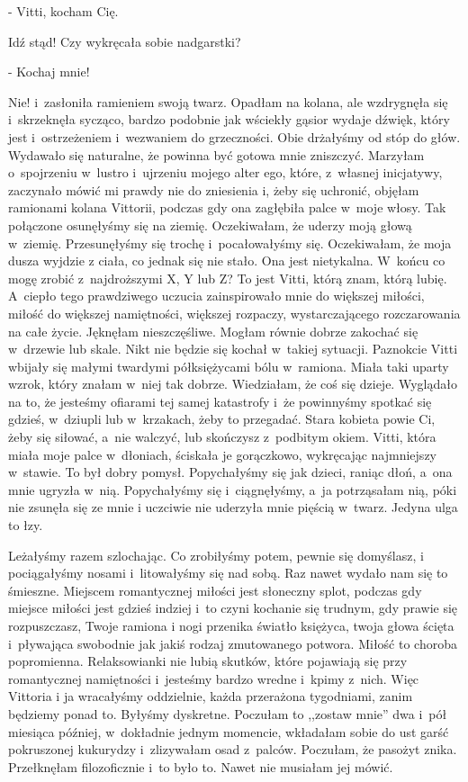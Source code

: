 \documentclass[oneside,polish,12pt,sfheadings]{mwbk}
\begin{document}
- Vitti, kocham Cię.

Idź stąd! Czy wykręcała sobie nadgarstki?

- Kochaj mnie!

Nie! i~zasłoniła ramieniem swoją twarz. Opadłam na kolana, ale wzdrygnęła
się i~skrzeknęła sycząco, bardzo podobnie jak wściekły gąsior wydaje
dźwięk, który jest i~ostrzeżeniem i~wezwaniem do grzeczności. Obie
drżałyśmy od stóp do głów. Wydawało się naturalne, że powinna być
gotowa mnie zniszczyć. Marzyłam o~spojrzeniu w~lustro i~ujrzeniu mojego
alter ego, które, z~własnej inicjatywy, zaczynało mówić mi prawdy
nie do zniesienia i, żeby się uchronić, objęłam ramionami kolana Vittorii,
podczas gdy ona zagłębiła palce w~moje włosy. Tak połączone osunęłyśmy
się na ziemię. Oczekiwałam, że uderzy moją głową w~ziemię. Przesunęłyśmy
się trochę i~pocałowałyśmy się. Oczekiwałam, że moja dusza wyjdzie
z ciała, co jednak się nie stało. Ona jest nietykalna. W~końcu co
mogę zrobić z~najdroższymi X, Y lub Z? To jest Vitti, którą znam,
którą lubię. A~ciepło tego prawdziwego uczucia zainspirowało mnie
do większej miłości, miłość do większej namiętności, większej rozpaczy,
wystarczającego rozczarowania na całe życie. Jęknęłam nieszczęśliwe.
Mogłam równie dobrze zakochać się w~drzewie lub skale. Nikt nie będzie
się kochał w~takiej sytuacji. Paznokcie Vitti wbijały się małymi
twardymi półksiężycami bólu w~ramiona. Miała taki uparty wzrok, który
znałam w~niej tak dobrze. Wiedziałam, że coś się dzieje. Wyglądało
na to, że jesteśmy ofiarami tej samej katastrofy i~że powinnyśmy spotkać
się gdzieś, w~dziupli lub w~krzakach, żeby to przegadać. Stara kobieta
powie Ci, żeby się siłować, a~nie walczyć, lub skończysz z~podbitym
okiem. Vitti, która miała moje palce w~dłoniach, ściskała je gorączkowo,
wykręcając najmniejszy w~stawie. To był dobry pomysł. Popychałyśmy
się jak dzieci, raniąc dłoń, a~ona mnie ugryzła w~nią. Popychałyśmy
się i~ciągnęłyśmy, a~ja potrząsałam nią, póki nie zsunęła się ze mnie
i uczciwie nie uderzyła mnie pięścią w~twarz. Jedyna ulga to łzy.

Leżałyśmy razem szlochając. Co zrobiłyśmy potem, pewnie się domyślasz,
i pociągałyśmy nosami i~litowałyśmy się nad sobą. Raz nawet wydało
nam się to śmieszne. Miejscem romantycznej miłości jest słoneczny
splot, podczas gdy miejsce miłości jest gdzieś indziej i~to czyni
kochanie się trudnym, gdy prawie się rozpuszczasz, Twoje ramiona i
nogi przenika światło księżyca, twoja głowa ścięta i~pływająca swobodnie
jak jakiś rodzaj zmutowanego potwora. Miłość to choroba popromienna.
Relaksowianki nie lubią skutków, które pojawiają się przy romantycznej
namiętności i~jesteśmy bardzo wredne i~kpimy z~nich. Więc Vittoria
i ja wracałyśmy oddzielnie, każda przerażona tygodniami, zanim będziemy
ponad to. Byłyśmy dyskretne. Poczułam to ,,zostaw mnie'' dwa i~pół miesiąca
później, w~dokładnie jednym momencie, wkładałam sobie do ust garść
pokruszonej kukurydzy i~zlizywałam osad z~palców. Poczułam, że pasożyt
znika. Przełknęłam filozoficznie i~to było to. Nawet nie musiałam
jej mówić.
\end{document}
